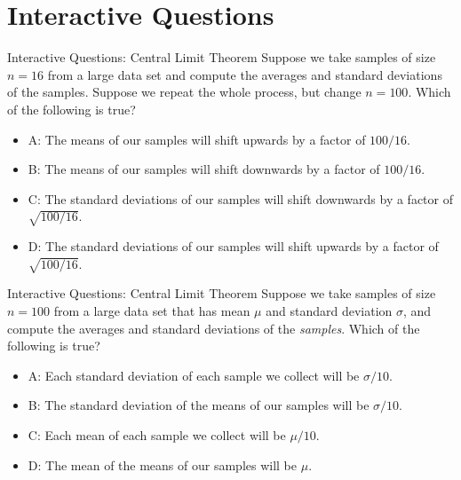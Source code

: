 \documentclass{beamer}
\begin{document}
\section{Interactive Questions}

\begin{frame}{Interactive Questions: Central Limit Theorem}
Suppose we take samples of size $n = 16$ from a large data set and compute the averages and standard deviations of the samples.  Suppose we repeat the whole process, but change $n = 100$.  Which of the following is true?
\begin{itemize}
\item A: The means of our samples will shift upwards by a factor of $100/16$.
\item B: The means of our samples will shift downwards by a factor of $100/16$.
\item C: The standard deviations of our samples will shift downwards by a factor of $\sqrt{100/16}$.
\item D: The standard deviations of our samples will shift upwards by a factor of $\sqrt{100/16}$.
\end{itemize}
\end{frame}

\begin{frame}{Interactive Questions: Central Limit Theorem}
Suppose we take samples of size $n = 100$ from a large data set that has mean $\mu$ and standard deviation $\sigma$, and compute the averages and standard deviations of the \textit{samples}.  Which of the following is true?
\begin{itemize}
\item A: Each standard deviation of each sample we collect will be $\sigma/10$.
\item B: The standard deviation of the means of our samples will be $\sigma/10$.
\item C: Each mean of each sample we collect will be $\mu/10$.
\item D: The mean of the means of our samples will be $\mu$.
\end{itemize}
\end{frame}
\end{document}
